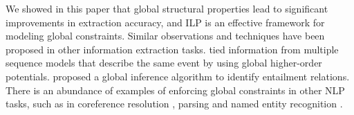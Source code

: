 
 
We showed in this paper that global structural properties lead to significant improvements in extraction accuracy, and ILP is an effective framework for modeling global constraints. Similar observations and techniques have been proposed in other information extraction tasks. 
 tied information from multiple sequence models that describe the same event by using global higher-order potentials. 
 proposed a global inference algorithm to identify entailment relations.  
There is an abundance of examples of enforcing global constraints in other NLP tasks, such as in coreference resolution \cite{Finkel08}, parsing \cite{Rush12} and named entity recognition \cite{Wang13}.
